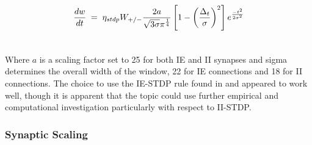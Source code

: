 \documentclass[10pt,letterpaper]{article}
\begin{document}
\begin{gather}
	\frac{dw}{dt} \;=\; \eta_{stdp} W_{+/-}\frac{2a}{\sqrt{3\sigma}\pi^\frac{1}{4}}\left[1-\left(\frac{\Delta_t}{\sigma}\right)^2\right]e^{\frac{-t^2}{2\sigma^2}} \\ \notag
\end{gather}
	
Where $a$ is a scaling factor set to 25 for both IE and II synapses and sigma determines the overall width of the window, 22 for IE connections and 18 for II connections. The choice to use the IE-STDP rule found in \cite{woodin2003coincident} and \cite{d2015inhibitory} appeared to work well, though it is apparent that the topic could use further empirical and computational investigation particularly with respect to II-STDP. 

\subsubsection*{Synaptic Scaling}
\end{document}
